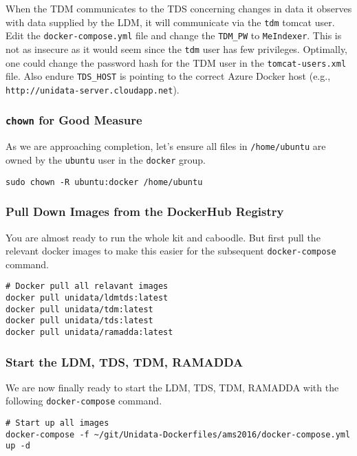 \documentclass{article}
\begin{document}
When the TDM communicates to the TDS concerning changes in data it observes with data supplied by the LDM, it will communicate via the \texttt{tdm} tomcat user. Edit the \texttt{docker-compose.yml} file and change the \texttt{TDM\_PW} to \texttt{MeIndexer}. This is not as insecure as it would seem since the \texttt{tdm} user has few privileges. Optimally, one could change the password hash for the TDM user in the \texttt{tomcat-users.xml} file. Also endure \texttt{TDS\_HOST} is pointing to the correct Azure Docker host (e.g., \texttt{http://unidata-server.cloudapp.net}).



\subsubsection{\texttt{chown} for Good Measure}
\label{sec:orgheadline38}

As we are approaching completion, let's ensure all files in \texttt{/home/ubuntu} are owned by the \texttt{ubuntu} user in the \texttt{docker} group.

\begin{verbatim}
sudo chown -R ubuntu:docker /home/ubuntu
\end{verbatim}

\subsubsection{Pull Down Images from the DockerHub Registry}
\label{sec:orgheadline39}

You are almost ready to run the whole kit and caboodle. But first  pull the relevant docker images to make this easier for the subsequent \texttt{docker-compose} command.

\begin{verbatim}
# Docker pull all relavant images
docker pull unidata/ldmtds:latest
docker pull unidata/tdm:latest
docker pull unidata/tds:latest
docker pull unidata/ramadda:latest
\end{verbatim}

\subsubsection{Start the LDM, TDS, TDM, RAMADDA}
\label{sec:orgheadline40}

We are now finally ready to start the LDM, TDS, TDM, RAMADDA with the following \texttt{docker-compose} command.

\begin{verbatim}
# Start up all images
docker-compose -f ~/git/Unidata-Dockerfiles/ams2016/docker-compose.yml up -d
\end{verbatim}
\end{document}
